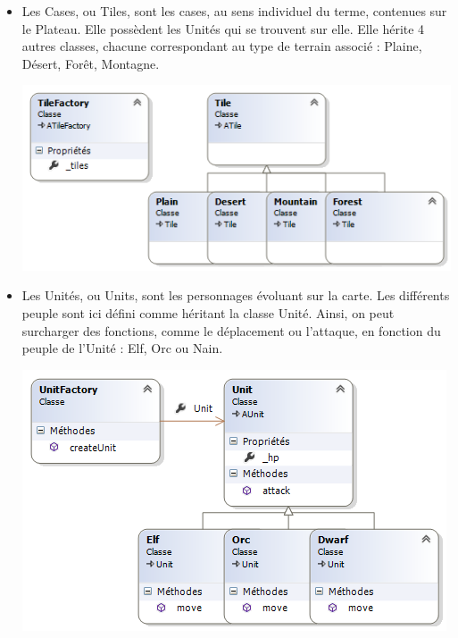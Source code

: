 \begin{itemize}
  \item Les Cases, ou Tiles, sont les cases, au sens individuel du terme, contenues sur le Plateau. Elle possèdent les Unités qui se trouvent sur elle. Elle hérite 4 autres classes, chacune correspondant au type de terrain associé : Plaine, Désert, Forêt, Montagne.
	
	\includegraphics[width=\textwidth]{img/cd_tiles.png}
	
  \item Les Unités, ou Units, sont les personnages évoluant sur la carte. Les différents peuple sont ici défini comme héritant la classe Unité. Ainsi, on peut surcharger des fonctions, comme le déplacement ou l'attaque, en fonction du peuple de l'Unité : Elf, Orc ou Nain.
	
	\includegraphics[width=\textwidth]{img/cd_units.png}
	
\end{itemize}

\newpage
